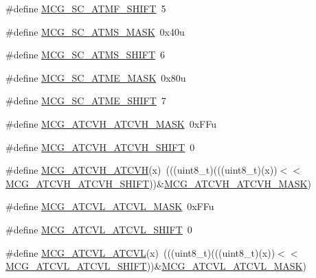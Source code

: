 \begin{DoxyCompactItemize}
\item 
\#define \hyperlink{group___m_c_g___register___masks_gac7fd1ff91fc1de6800a18f875398d966}{M\+C\+G\+\_\+\+S\+C\+\_\+\+A\+T\+M\+F\+\_\+\+S\+H\+I\+FT}~5
\item 
\#define \hyperlink{group___m_c_g___register___masks_gaf5a12b51cc62a0ce10f3fbecdebd0222}{M\+C\+G\+\_\+\+S\+C\+\_\+\+A\+T\+M\+S\+\_\+\+M\+A\+SK}~0x40u
\item 
\#define \hyperlink{group___m_c_g___register___masks_ga9a8ce406d5868276e9c3b37190ab89b1}{M\+C\+G\+\_\+\+S\+C\+\_\+\+A\+T\+M\+S\+\_\+\+S\+H\+I\+FT}~6
\item 
\#define \hyperlink{group___m_c_g___register___masks_gaf9545e815c86bd04d8513af024cb8617}{M\+C\+G\+\_\+\+S\+C\+\_\+\+A\+T\+M\+E\+\_\+\+M\+A\+SK}~0x80u
\item 
\#define \hyperlink{group___m_c_g___register___masks_ga146594251d4266d02fecc44c1f0dd6ae}{M\+C\+G\+\_\+\+S\+C\+\_\+\+A\+T\+M\+E\+\_\+\+S\+H\+I\+FT}~7
\item 
\#define \hyperlink{group___m_c_g___register___masks_gaf989f84acb1a8c91c7c98c2255651b00}{M\+C\+G\+\_\+\+A\+T\+C\+V\+H\+\_\+\+A\+T\+C\+V\+H\+\_\+\+M\+A\+SK}~0x\+F\+Fu
\item 
\#define \hyperlink{group___m_c_g___register___masks_ga0fec2d450a98ab78dc7a2e4e9e33dbc6}{M\+C\+G\+\_\+\+A\+T\+C\+V\+H\+\_\+\+A\+T\+C\+V\+H\+\_\+\+S\+H\+I\+FT}~0
\item 
\#define \hyperlink{group___m_c_g___register___masks_gab382a7e152cca964b5cd64708384c608}{M\+C\+G\+\_\+\+A\+T\+C\+V\+H\+\_\+\+A\+T\+C\+VH}(x)~(((uint8\+\_\+t)(((uint8\+\_\+t)(x))$<$$<$\hyperlink{group___m_c_g___register___masks_ga0fec2d450a98ab78dc7a2e4e9e33dbc6}{M\+C\+G\+\_\+\+A\+T\+C\+V\+H\+\_\+\+A\+T\+C\+V\+H\+\_\+\+S\+H\+I\+FT}))\&\hyperlink{group___m_c_g___register___masks_gaf989f84acb1a8c91c7c98c2255651b00}{M\+C\+G\+\_\+\+A\+T\+C\+V\+H\+\_\+\+A\+T\+C\+V\+H\+\_\+\+M\+A\+SK})
\item 
\#define \hyperlink{group___m_c_g___register___masks_ga48750526150212b524f731e303a7e3cf}{M\+C\+G\+\_\+\+A\+T\+C\+V\+L\+\_\+\+A\+T\+C\+V\+L\+\_\+\+M\+A\+SK}~0x\+F\+Fu
\item 
\#define \hyperlink{group___m_c_g___register___masks_ga9e3e0eab24aaf1bf2905ae0cf4803eb3}{M\+C\+G\+\_\+\+A\+T\+C\+V\+L\+\_\+\+A\+T\+C\+V\+L\+\_\+\+S\+H\+I\+FT}~0
\item 
\#define \hyperlink{group___m_c_g___register___masks_ga124aa7c8cc26cfd1c06a278add1a0d21}{M\+C\+G\+\_\+\+A\+T\+C\+V\+L\+\_\+\+A\+T\+C\+VL}(x)~(((uint8\+\_\+t)(((uint8\+\_\+t)(x))$<$$<$\hyperlink{group___m_c_g___register___masks_ga9e3e0eab24aaf1bf2905ae0cf4803eb3}{M\+C\+G\+\_\+\+A\+T\+C\+V\+L\+\_\+\+A\+T\+C\+V\+L\+\_\+\+S\+H\+I\+FT}))\&\hyperlink{group___m_c_g___register___masks_ga48750526150212b524f731e303a7e3cf}{M\+C\+G\+\_\+\+A\+T\+C\+V\+L\+\_\+\+A\+T\+C\+V\+L\+\_\+\+M\+A\+SK})

\end{DoxyCompactItemize}
